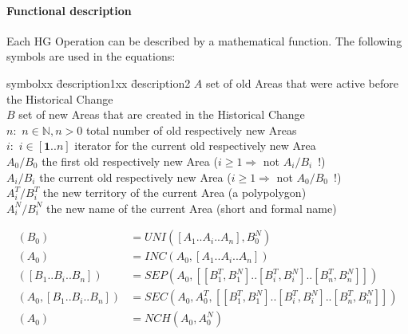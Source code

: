 \paragraph{Functional description} %
\label{par:functional_description}

Each HG Operation can be described by a mathematical function. The following symbols are used in the equations:

\begin{addmargin}[1em]{0em}
\begin{tabbing}
  symbolxx \= description1xx \= description2 \kill
  $A$ \> set of old Areas that were active before the Historical Change \\
  $B$ \> set of new Areas that are created in the Historical Change \\
  $n:$ \> $n \in \mathbb{N}, n>0$ \> total number of old respectively new Areas \\
  $i:$ \> $i \in [\textbf{1} .. n]$ \> iterator for the current old respectively new Area \\
  $A_0/B_0$ \>    the first old respectively new Area ($i \geq 1 \Rightarrow$ not $A_i/B_i$~!) \\
  $A_i/B_i$ \>    the current old respectively new Area ($i \geq 1 \Rightarrow$ not $A_0/B_0$~!) \\
  $A_i^T/B_i^T$ \>the new territory of the current Area (a polypolygon) \\
  $A_i^N/B_i^N$ \>the new name of the current Area (short and formal name) \\
\end{tabbing}
\end{addmargin}

\vspace{-2.5em}
\begin{align*}
  (B_0)                       &= UNI([A_1 .. A_i .. A_n], B_0^N) \\
  (A_0)                       &= INC(A_0, [A_1 .. A_i .. A_n]) \\
  ([B_1 .. B_i .. B_n])       &= SEP(A_0, [[B_1^T, B_1^N] .. [B_i^T, B_i^N] .. [B_n^T, B_n^N]]) \\
  (A_0, [B_1 .. B_i .. B_n])  &= SEC(A_0, A_0^T, [[B_1^T, B_1^N] .. [B_i^T, B_i^N] .. [B_n^T, B_n^N]]) \\
  (A_0)                       &= NCH(A_0, A_0^N)
\end{align*}



